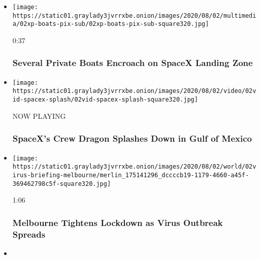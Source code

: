 \begin{itemize}
\item
  \href{https://www.nytimes3xbfgragh.onion/video/us/100000007269193/boats-circle-spacex-capsule.html?action=click\&module=video-series-bar\&region=header\&pgtype=Article\&playlistId=video/latest-video}{}

  \texttt{[image: https://static01.graylady3jvrrxbe.onion/images/2020/08/02/multimedia/02xp-boats-pix-sub/02xp-boats-pix-sub-square320.jpg]}

  0:37

  \hypertarget{several-private-boats-encroach-on-spacex-landing-zone}{%
  \subsubsection{Several Private Boats Encroach on SpaceX Landing
  Zone}\label{several-private-boats-encroach-on-spacex-landing-zone}}
\item
  \texttt{[image: https://static01.graylady3jvrrxbe.onion/images/2020/08/02/video/02vid-spacex-splash/02vid-spacex-splash-square320.jpg]}

  NOW PLAYING

  \hypertarget{spacexs-crew-dragon-splashes-down-in-gulf-of-mexico-2}{%
  \subsubsection{SpaceX's Crew Dragon Splashes Down in Gulf of
  Mexico}\label{spacexs-crew-dragon-splashes-down-in-gulf-of-mexico-2}}
\item
  \href{https://www.nytimes3xbfgragh.onion/video/world/australia/100000007269116/coronavirus-restrictions-melbourne.html?action=click\&module=video-series-bar\&region=header\&pgtype=Article\&playlistId=video/latest-video}{}

  \texttt{[image: https://static01.graylady3jvrrxbe.onion/images/2020/08/02/world/02virus-briefing-melbourne/merlin\_175141296\_dccccb19-1179-4660-a45f-369462798c5f-square320.jpg]}

  1:06

  \hypertarget{melbourne-tightens-lockdown-as-virus-outbreak-spreads}{%
  \subsubsection{Melbourne Tightens Lockdown as Virus Outbreak
  Spreads}\label{melbourne-tightens-lockdown-as-virus-outbreak-spreads}}
\item
  \href{https://www.nytimes3xbfgragh.onion/video/us/100000007268938/isaias-florida.html?action=click\&module=video-series-bar\&region=header\&pgtype=Article\&playlistId=video/latest-video}{}


\end{itemize}
